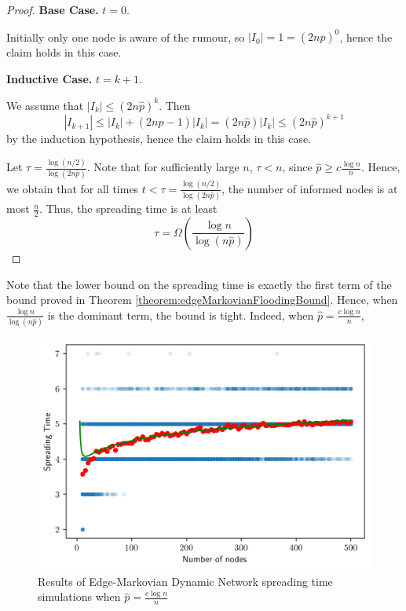 \begin{proof}
	\textbf{Base Case.} $t=0$.

	Initially only one node is aware of the rumour, so $|I_0| = 1 = (2n\hat{p})^0$, hence the claim holds in this case.

	\textbf{Inductive Case.} $t=k+1$.

	We assume that $|I_k| \leq (2n\hat{p})^k$. Then 
	$$
		|I_{k+1}| \leq |I_k| + (2n\hat{p} - 1)|I_k| = (2n\hat{p})|I_k| \leq (2n\hat{p})^{k+1}
	$$
	by the induction hypothesis, hence the claim holds in this case.

	Let $\tau = \frac{\log (n/2)}{\log(2n\hat{p})}$. Note that for sufficiently large $n$, $\tau < n$, since $\hat{p} \geq c \frac{\log n}{n}$.  %
	Hence, we obtain that for all times $t < \tau = \frac{\log (n/2)}{\log(2n\hat{p})}$, the number of informed nodes is at most $\frac{n}{2}$. Thus, the spreading time is at least 
	$$
		\tau = \Omega\left(\frac{\log n}{\log(n \hat{p})}\right)
	$$
\end{proof}

Note that the lower bound on the spreading time is exactly the first term of the bound proved in Theorem \ref{theorem:edgeMarkovianFloodingBound}. Hence, when $\frac{\log n}{\log (n\hat{p})}$ is the dominant term, the bound is tight. Indeed, when $\hat{p} = \frac{c \log n}{n}$, %


 

\begin{figure}[h]
	\centering
	\includegraphics[width=1\textwidth]{./figures/flooding_gnp_simulation_results.png}
	\caption{Results of Edge-Markovian Dynamic Network spreading time simulations when $\hat{p} = \frac{c \log n}{n}$}
	\label{fig:floodingGnpSimResultsTight}
\end{figure}

